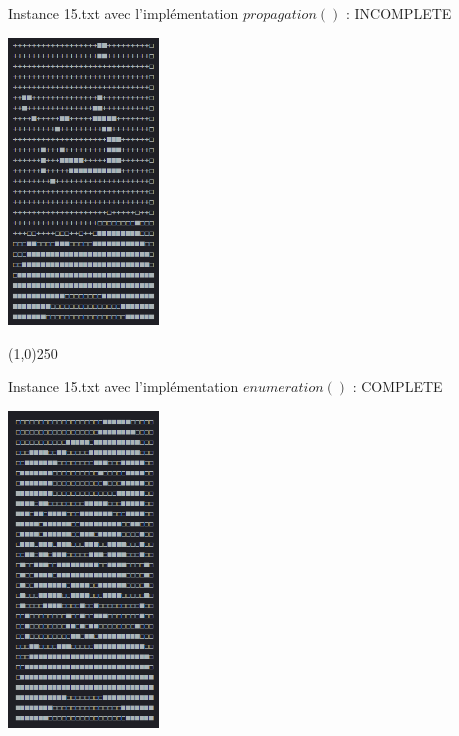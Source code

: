\documentclass[a4paper,12pt]{article}
\begin{document}
\newpage

\begin{center}Instance 15.txt avec l'implémentation $propagation()$ : INCOMPLETE\end{center}
\begin{center}\includegraphics[width=4cm]{instance15_BAD.png}\end{center}

 \begin{center}
   \line(1,0){250}
 \end{center}

\begin{center}Instance 15.txt avec l'implémentation $enumeration()$ : COMPLETE\end{center}
\begin{center}\includegraphics[width=4cm]{instance15_GREAT.png}\end{center}
\end{document}
